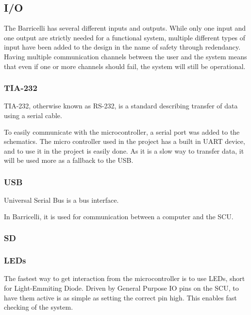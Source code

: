 \subsection{I/O}

The Barricelli has several different inputs and outputs.
While only one input and one output are strictly needed for a functional system, multiple different types of input have been added to the design in the name of safety through redendancy.
Having multiple communication channels between the user and the system means that even if one or more channels should fail, the system will still be operational.

\subsubsection{TIA-232}

TIA-232, otherwise known as RS-232, is a standard describing transfer of data using a serial cable. 

To easily communicate with the microcontroller, a serial port was added to the schematics. The micro controller used in the project has a built in UART device\cite{efm32gg990-datasheet}, 
and to use it in the project is easily done. As it is a slow way to transfer data, it will be used more as a fallback to the USB.

\subsubsection{USB}

Universal Serial Bus is a bus interface.

In Barricelli, it is used for communication between a computer and the SCU.

\subsubsection{SD}


\subsubsection{LEDs}

The fastest way to get interaction from the microcontroller is to use LEDs, short for Light-Emmiting Diode. Driven by General Purpose IO pins on the SCU, to have them active is as simple 
as setting the correct pin high. This enables fast checking of the system.

